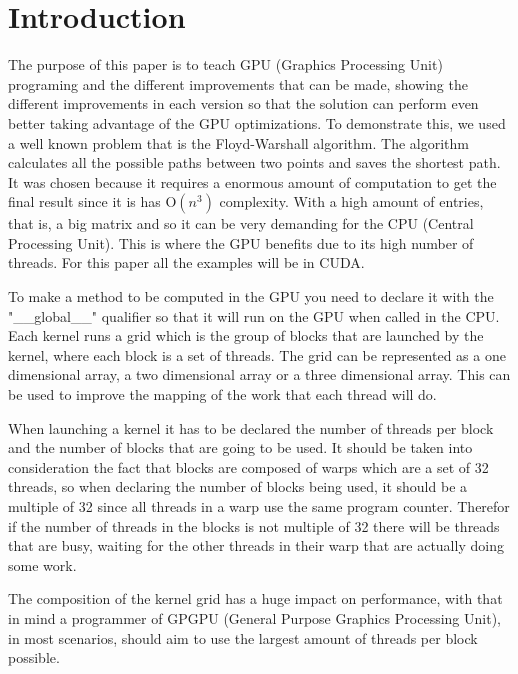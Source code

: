 \documentclass[conference]{IEEEtran}
\begin{document}
\section{Introduction}
The purpose of this paper is to teach GPU (Graphics Processing Unit) programing and the different improvements that can be made, showing the different improvements in each version so that the solution can perform even better taking advantage of the GPU optimizations. To demonstrate this, we used a well known problem that is the Floyd-Warshall algorithm. The algorithm calculates all the possible paths between two points and saves the shortest path. It was chosen because it requires a enormous amount of computation to get the final result since it is has O$(n^{3})$ complexity. With a high amount of entries, that is, a big matrix and so it can be very demanding for the CPU (Central Processing Unit). This is where the GPU benefits due to its high number of threads.
\newline
For this paper all the examples will be in CUDA. %

To make a method to be computed in the GPU you need to declare it with the "\_\_global\_\_" qualifier so that it will run on the GPU when called in the CPU. Each kernel runs a grid which is the group of blocks that are launched by the kernel, where each block is a set of threads. The grid can be represented as a one dimensional array, a two dimensional array or a three dimensional array. This can be used to improve the mapping of the work that each thread will do. 

When launching a kernel it has to be declared the number of threads per block and the number of blocks that are going to be used. It should be taken into consideration the fact that blocks are composed of warps which are a set of 32 threads, so when declaring the number of blocks being used, it should be a multiple of 32 since all threads in a warp use the same program counter. Therefor if the number of threads in the blocks is not multiple of 32 there will be threads that are busy, waiting for the other threads in their warp that are actually doing some work.

The composition of the kernel grid has a huge impact on performance, with that in mind a programmer of GPGPU (General Purpose Graphics Processing Unit), in most scenarios, should aim to use the largest amount of threads per block possible.
\end{document}
